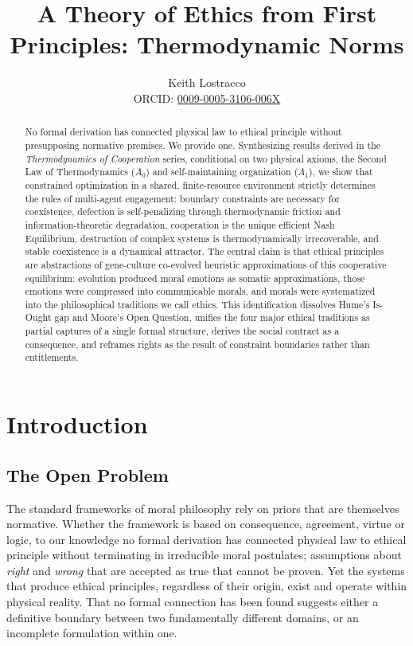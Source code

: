 \documentclass[11pt]{article}
\title{A Theory of Ethics from First Principles: Thermodynamic Norms}
\author{%
Keith Lostracco%
\\[0.25em]{\normalsize ORCID: \href{https://orcid.org/0009-0005-3106-006X}{0009-0005-3106-006X}}%
}
\date{}
\theoremstyle{plain}
\theoremstyle{definition}
\theoremstyle{remark}
\let\origsection\section
\renewcommand{\section}{\needspace{12\baselineskip}\origsection}
\let\origsubsection\subsection
\renewcommand{\subsection}{\needspace{7\baselineskip}\origsubsection}
\begin{document}
\maketitle

\begin{abstract}
No formal derivation has connected physical law to ethical principle
without presupposing normative premises. We provide one. Synthesizing
results derived in the \emph{Thermodynamics of Cooperation} series,
conditional on two physical axioms, the Second Law of Thermodynamics
(\(A_0\)) and self-maintaining organization (\(A_1\)), we show that
constrained optimization in a shared, finite-resource environment
strictly determines the rules of multi-agent engagement: boundary
constraints are necessary for coexistence, defection is self-penalizing
through thermodynamic friction and information-theoretic degradation,
cooperation is the unique efficient Nash Equilibrium, destruction of
complex systems is thermodynamically irrecoverable, and stable
coexistence is a dynamical attractor. The central claim is that ethical
principles are abstractions of gene-culture co-evolved heuristic
approximations of this cooperative equilibrium: evolution produced moral
emotions as somatic approximations, those emotions were compressed into
communicable morals, and morals were systematized into the philosophical
traditions we call ethics. This identification dissolves Hume's Is-Ought
gap and Moore's Open Question, unifies the four major ethical traditions
as partial captures of a single formal structure, derives the social
contract as a consequence, and reframes rights as the result of
constraint boundaries rather than entitlements.
\end{abstract}
\section{Introduction}\label{introduction}

\subsection{The Open Problem}\label{the-open-problem}

The standard frameworks of moral philosophy rely on priors that are
themselves normative. Whether the framework is based on consequence,
agreement, virtue or logic, to our knowledge no formal derivation has
connected physical law to ethical principle without terminating in
irreducible moral postulates; assumptions about \emph{right} and
\emph{wrong} that are accepted as true that cannot be proven. Yet the
systems that produce ethical principles, regardless of their origin,
exist and operate within physical reality. That no formal connection has
been found suggests either a definitive boundary between two
fundamentally different domains, or an incomplete formulation within
one.
\end{document}
